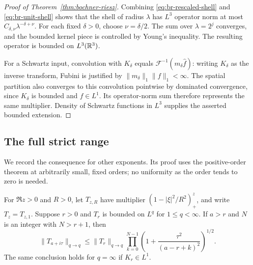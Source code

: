 \begin{proof}[Proof of Theorem~\ref{thm:bochner-riesz}]
Combining \eqref{eq:br-rescaled-shell} and \eqref{eq:br-unit-shell}
shows that the shell of radius $\lambda$ has $L^3$ operator norm at
most $C_{\delta,\nu}\lambda^{-\delta+\nu}$.  For each fixed
$\delta>0$, choose $\nu=\delta/2$.  The sum over $\lambda=2^j$
converges, and the bounded kernel piece is controlled by Young's
inequality.  The resulting operator is bounded on $L^3(\mathbb R^3)$.

For a Schwartz input, convolution with $K_\delta$ equals
$\mathcal F^{-1}(m_\delta\widehat f)$: writing $K_\delta$ as the
inverse transform, Fubini is justified by
$\|m_\delta\|_1\|f\|_1<\infty$.  The spatial partition also
converges to this convolution pointwise by dominated convergence,
since $K_\delta$ is bounded and $f\in L^1$.  Its operator-norm sum
therefore represents the same multiplier.  Density of Schwartz
functions in $L^3$ supplies the asserted bounded extension.
\end{proof}

\subsection{The full strict range}

We record the consequence for other exponents.  Its proof uses the
positive-order theorem at arbitrarily small, fixed orders; no
uniformity as the order tends to zero is needed.

\begin{lemma}\label{lem:br-complex-order}
For $\Re z>0$ and $R>0$, let $T_{z,R}$ have multiplier
$(1-|\xi|^2/R^2)_+^z$, and write $T_z=T_{z,1}$.  Suppose $r>0$
and $T_r$ is bounded on $L^q$ for $1\le q<\infty$.  If $a>r$ and
$N$ is an integer with $N>r+1$, then
\begin{equation}\label{eq:br-complex-bound}
 \|T_{a+i\tau}\|_{q\to q}
 \le \|T_r\|_{q\to q}
 \prod_{k=0}^{N-1}\left(1+\frac{\tau^2}{(a-r+k)^2}\right)^{1/2}.
\end{equation}
The same conclusion holds for $q=\infty$ if $K_r\in L^1$.
\end{lemma}

